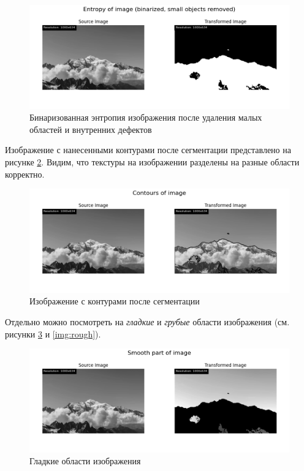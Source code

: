 \begin{figure}[ht!]
    \centering
    \includegraphics[width=\textwidth]{../results/Entropy of image (binarized, small objects removed).png}
    \caption{Бинаризованная энтропия изображения после удаления малых областей и внутренних дефектов}
    \label{ing:BW_E_SR_OR}
\end{figure}

Изображение с нанесенными контурами после сегментации представлено на рисунке \ref{img:regions}.
Видим, что текстуры на изображении разделены на разные области корректно. 

\begin{figure}[ht!]
    \centering
    \includegraphics[width=\textwidth]{../results/Contours of image.png}
    \caption{Изображение с контурами после сегментации}
    \label{img:regions}
\end{figure}

Отдельно можно посмотреть на \textit{гладкие} и \textit{грубые} области изображения (см. рисунки \ref{img:smooth} и \ref{img:rough}).

\begin{figure}[ht!]
    \centering
    \includegraphics[width=\textwidth]{../results/Smooth part of image.png}
    \caption{Гладкие области изображения}
    \label{img:smooth}
\end{figure}

